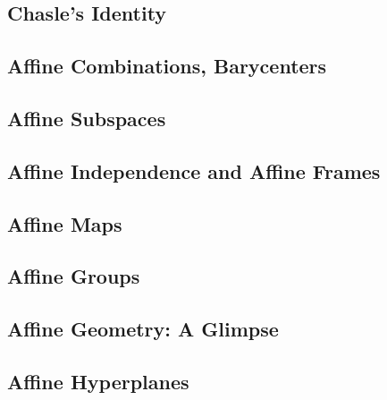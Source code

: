 \documentclass[a4paper]{article}
\begin{document}
\subsection{ Chasle's Identity} %

\subsection{ Affine Combinations, Barycenters} %

\subsection{ Affine Subspaces} %

\subsection{ Affine Independence and Affine Frames} %

\subsection{ Affine Maps} %

\subsection{ Affine Groups} %

\subsection{ Affine Geometry: A Glimpse} %

\subsection{ Affine Hyperplanes} %
\end{document}
